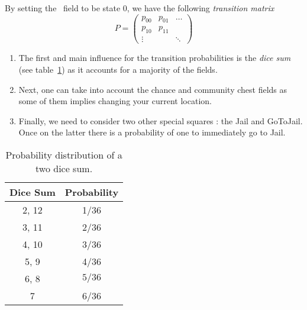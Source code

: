 By setting the \go~field to be state 0, we have the following \emph{transition matrix}
\[
  P = \begin{pmatrix}
    p_{00} & p_{01} & \dots \\
    p_{10} & p_{11} &  \\
    \vdots      &  & \ddots
  \end{pmatrix}
\]

\begin{enumerate}
  \item The first and main influence for the transition probabilities
  is the \emph{dice sum} (see table~\ref{tab:dice_sum_prob})
  as it accounts for a majority of the fields.
  \item Next, one can take into account the chance and community chest
  fields as some of them implies changing your current location.
  \item Finally, we need to consider two other special squares :
  the Jail and GoToJail. Once on the latter there is a probability
  of one to immediately go to Jail.
\end{enumerate}

\begin{table}
  \begin{center}
    \begin{tabular}{|c|c|}
      \hline
        \textbf{Dice Sum} & \textbf{Probability} \\
        \hline \hline
        2, 12 & 1/36 \\
        \hline
        3, 11 & 2/36 \\
        \hline
        4, 10 & 3/36 \\
        \hline
        5, 9 & 4/36 \\
        \hline
        6, 8 & $5/36$ \\
        \hline
        7 & 6/36 \\
      \hline
    \end{tabular}
  \end{center}
  \caption{Probability distribution of a two dice sum.}
  \label{tab:dice_sum_prob}
\end{table}



